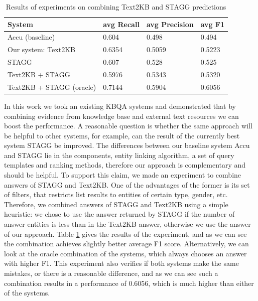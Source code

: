 


\begin{table}
\centering
\caption{Results of experiments on combining Text2KB and STAGG predictions}
\label{table:combine_stagg}
\begin{tabular}{| p{4cm} | p{1cm} | p{1cm} | p{1cm} | }
\hline
System & avg Recall & avg Precision & avg F1 \\
\hline
Accu (baseline) \cite{ACCU:2015} & 0.604 & 0.498 & 0.494\\
Our system: Text2KB & 0.6354 & 0.5059 & 0.5223 \\
STAGG \cite{yih2015semantic} & 0.607 & 0.528 & 0.525\\
\hline
Text2KB + STAGG & 0.5976 & 0.5343 & 0.5320 \\
Text2KB + STAGG (oracle) & 0.7144 & 0.5904 & 0.6056 \\
\hline
\end{tabular}
\end{table}

In this work we took an existing KBQA systems and demonstrated that by combining evidence from knowledge base and external text resources we can boost the performance.
A reasonable question is whether the same approach will be helpful to other systems, \eg for example, can the result of the currently best system STAGG \cite{yih2015semantic} be improved.
The differences between our baseline system Accu and STAGG lie in the components, \ie entity linking algorithm, a set of query templates and ranking methods, therefore our approach is complementary and should be helpful.
To support this claim, we made an experiment to combine answers of STAGG and Text2KB.
One of the advantages of the former is its set of filters, that restricts list results to entities of certain type, gender, etc.
Therefore, we combined answers of STAGG and Text2KB using a simple heuristic: we chose to use the answer returned by STAGG if the number of answer entities is less than in the Text2KB answer, otherwise we use the answer of our approach.
Table \ref{table:combine_stagg} gives the results of the experiment, and as we can see the combination achieves slightly better average F1 score.
Alternatively, we can look at the oracle combination of the systems, which always chooses an answer with higher F1.
This experiment also verifies if both systems make the same mistakes, or there is a reasonable difference, and as we can see such a combination results in a performance of 0.6056, which is much higher than either of the systems.

